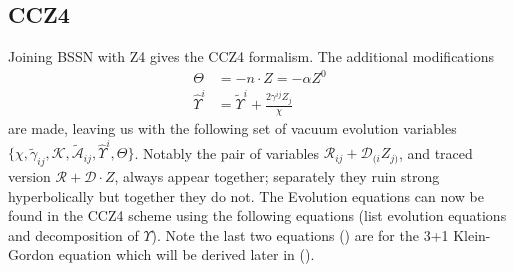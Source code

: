 \documentclass[11pt, oneside]{report}  %
\newcommand{\D}{\mathcal{D}}
\newcommand{\K}{\mathcal{K}}
\newcommand{\R}{\mathcal{R}}
\newcommand{\A}{\mathcal{A}}
\numberwithin{equation}{section}
\begin{document}
\subsection{CCZ4}
Joining BSSN with Z4 gives the CCZ4 formalism. The additional modifications
\begin{align} \Theta &= -n\cdot Z  = -\alpha Z^0\\
\hat{\Upsilon}^i &= \tilde{\Upsilon}^i + \frac{2\gamma^{ij}Z_j}{\chi}\end{align}
are made, leaving us with the following set of vacuum evolution variables $\{\chi, \tilde{\gamma}_{ij},\K,\tilde{\A}_{ij},\hat{\Upsilon}^i,\Theta \}$. Notably the pair of variables $\R_{ij} + \D_{(i}Z_{j)}$, and traced version $\R + \D\cdot Z$, always appear together; separately they ruin strong hyperbolically but together they do not. The Evolution equations can now be found in the CCZ4 scheme using the following equations (list evolution equations and decomposition of $\Upsilon$). Note the last two equations () are for the 3+1 Klein-Gordon equation which will be derived later in (). 
\end{document}
